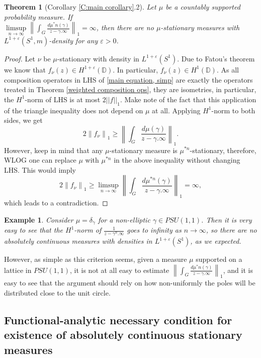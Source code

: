 \documentclass[11pt]{article}
\newtheorem{theorem}{Theorem}[section]
\newtheorem{example}{Example}[section]
\begin{document}
\begin{theorem}[Corollary \ref{C:main corollary}.2]
	Let $\mu$ be a countably supported probability measure. If \\ $\limsup\limits_{n \rightarrow \infty} \left\| \int_G \frac{d \mu^*n(\gamma)}{z - \gamma.\infty} \right\|_1 = \infty$, then there are no $\mu$-stationary measures with $L^{1+\varepsilon}(S^1, m)$-density for any $\varepsilon > 0$.
\end{theorem}
\begin{proof}
	Let $\nu$ be $\mu$-stationary with density in $L^{1+\varepsilon}(S^1)$. Due to Fatou's theorem we know that $f_\nu(z) \in H^{1 + \varepsilon}(\mathbb{D})$. In particular, $f_\nu(z) \in H^1(\mathbb{D})$. As all composition operators in LHS of \eqref{main equation, simp} are exactly the operators treated in Theorem \ref{weighted composition ops}, they are isometries, in particular, the $H^1$-norm of LHS is at most $2||f||_1$. Make note of the fact that this application of the triangle inequality does not depend on $\mu$ at all. Applying $H^1$-norm to both sides, we get
	\[
	2 \left\| f_\nu \right\|_1 \ge \left\| \int_G \frac{d \mu(\gamma)}{z - \gamma.\infty} \right\|_1.
	\]
	However, keep in mind that any $\mu$-stationary measure is $\mu^{*n}$-stationary, therefore, WLOG one can replace $\mu$ with $\mu^{*n}$ in the above inequality without changing LHS. This would imply
	\[
	2 \left\| f_\nu \right\|_1 \ge \limsup\limits_{n \rightarrow \infty} \left\| \int_G \frac{d \mu^{*n}(\gamma)}{z - \gamma.\infty} \right\|_1 = \infty,
	\]
	which leads to a contradiction.
\end{proof}

\begin{example}
	Consider $\mu = \delta_\gamma$ for a non-elliptic $\gamma \in PSU(1,1)$. Then it is very easy to see that the $H^1$-norm of $\frac{1}{z - \gamma^n.\infty}$ goes to infinity as $n \rightarrow \infty$, so there are no absolutely continuous measures with densities in $L^{1 + \varepsilon}(S^1)$, as we expected.
\end{example}

However, as simple as this criterion seems, given a measure $\mu$ supported on a lattice in $PSU(1,1)$, it is not at all easy to estimate $\left\| \int_G \frac{d \mu^*n(\gamma)}{z - \gamma.\infty} \right\|_1$, and it is easy to see that the argument should rely on how non-uniformly the poles will be distributed close to the unit circle.

\subsection{Functional-analytic necessary condition for existence of absolutely continuous stationary measures}
\end{document}
